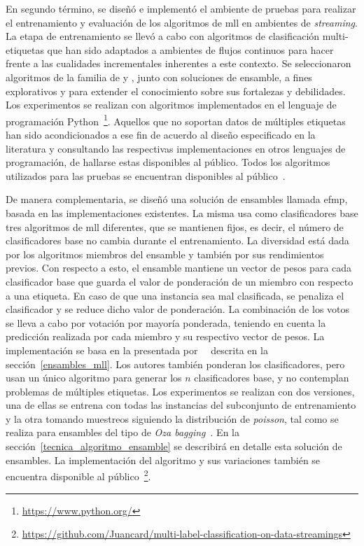 En segundo término, se diseñó e implementó el ambiente de pruebas para realizar
el entrenamiento y evaluación de los algoritmos de \acrshort{mll} en ambientes
de \textit{streaming}. La etapa de entrenamiento se llevó a cabo con algoritmos
de clasificación multi-etiquetas que han sido adaptados a ambientes de flujos
continuos para hacer frente a las cualidades incrementales inherentes a este
contexto. Se seleccionaron algoritmos de la familia de  y , junto con soluciones de
ensamble, a fines explorativos y para extender el conocimiento sobre sus
fortalezas y debilidades.  Los experimentos se realizan con algoritmos
implementados en el lenguaje de programación
Python~\footnote{\url{https://www.python.org/}}.  Aquellos que no soportan datos
de múltiples etiquetas han sido acondicionados a ese fin de acuerdo al diseño
especificado en la literatura y consultando las respectivas implementaciones en
otros lenguajes de programación, de hallarse estas disponibles al público. Todos
los algoritmos utilizados para las pruebas se encuentran disponibles al
público~\cite{montiel_scikit-multiflow_2018}.

De manera complementaria, se diseñó una solución de ensambles llamada
\acrfull{efmp}, basada en las implementaciones existentes. La misma usa como
clasificadores base tres algoritmos de \acrshort{mll} diferentes, que se
mantienen fijos, es decir, el número de clasificadores base no cambia durante el
entrenamiento. La diversidad está dada por los algoritmos miembros del ensamble
y también por sus rendimientos previos. Con respecto a esto, el ensamble
mantiene un vector de pesos para cada clasificador base que guarda el valor de
ponderación de un miembro con respecto a una etiqueta. En caso de que una
instancia sea mal clasificada, se penaliza el clasificador y se reduce dicho
valor de ponderación. La combinación de los votos se lleva a cabo por votación
por mayoría ponderada, teniendo en cuenta la predicción realizada por cada
miembro y su respectivo vector de pesos. La implementación se basa en la
presentada por~\citeauthor{kolter_dynamic_2007}~\cite{kolter_dynamic_2007}
descrita en la sección~\ref{ensambles_mll}. Los autores también ponderan los
clasificadores, pero usan un único algoritmo para generar los $n$ clasificadores
base, y no contemplan problemas de múltiples etiquetas. Los experimentos se
realizan con dos versiones, una de ellas se entrena con todas las instancias del
subconjunto de entrenamiento y la otra tomando muestreos siguiendo la
distribución de \textit{poisson}, tal como se realiza para ensambles del tipo de
\textit{Oza bagging}~\cite{oza_online_2005}. En la
sección~\ref{tecnica_algoritmo_ensamble} se describirá en detalle esta solución
de ensambles. La implementación del algoritmo y sus variaciones también se
encuentra disponible al
público~\footnote{\url{https://github.com/Juancard/multi-label-classification-on-data-streamings}}.

